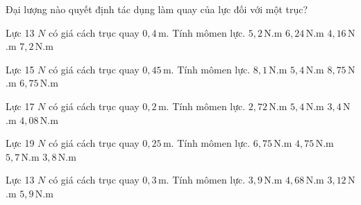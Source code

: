\begin{bt}
Đại lượng nào quyết định tác dụng làm quay của lực đối với một trục?
\end{bt}

\begin{ex}
Lực 13 $N$ có giá cách trục quay $0,4\,\text{m}$. Tính mômen lực.
\choice
{\True $5,2\,\text{N}$.m}
{$6,24\,\text{N}$.m}
{$4,16\,\text{N}$.m}
{$7,2\,\text{N}$.m}
\end{ex}

\begin{ex}
Lực 15 $N$ có giá cách trục quay $0,45\,\text{m}$. Tính mômen lực.
\choice
{$8,1\,\text{N}$.m}
{$5,4\,\text{N}$.m}
{$8,75\,\text{N}$.m}
{\True $6,75\,\text{N}$.m}
\end{ex}

\begin{ex}
Lực 17 $N$ có giá cách trục quay $0,2\,\text{m}$. Tính mômen lực.
\choice
{$2,72\,\text{N}$.m}
{$5,4\,\text{N}$.m}
{\True $3,4\,\text{N}$.m}
{$4,08\,\text{N}$.m}
\end{ex}

\begin{ex}
Lực 19 $N$ có giá cách trục quay $0,25\,\text{m}$. Tính mômen lực.
\choice
{$6,75\,\text{N}$.m}
{\True $4,75\,\text{N}$.m}
{$5,7\,\text{N}$.m}
{$3,8\,\text{N}$.m}
\end{ex}

\begin{ex}
Lực 13 $N$ có giá cách trục quay $0,3\,\text{m}$. Tính mômen lực.
\choice
{\True $3,9\,\text{N}$.m}
{$4,68\,\text{N}$.m}
{$3,12\,\text{N}$.m}
{$5,9\,\text{N}$.m}
\end{ex}

